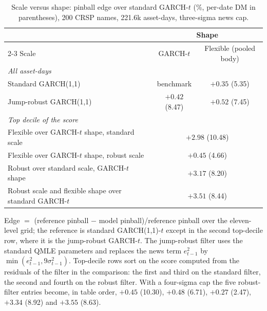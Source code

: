 \documentclass[11pt]{article}
\theoremstyle{remark}
\begin{document}
\begin{table}[t]
\centering
\begin{threeparttable}
\caption{Scale versus shape: pinball edge over standard GARCH-$t$ (\%, per-date DM in parentheses), 200 CRSP names, 221.6k asset-days, three-sigma news cap.}
\label{tab:scaleshape}
\begin{tabular}{lcc}
\toprule
& \multicolumn{2}{c}{Shape} \\
\cmidrule(lr){2-3}
Scale & GARCH-$t$ & Flexible (pooled body) \\
\midrule
\multicolumn{3}{l}{\emph{All asset-days}} \\
Standard GARCH(1,1) & benchmark & $+0.35$ (5.35) \\
Jump-robust GARCH(1,1) & $+0.42$ (8.47) & $+0.52$ (7.45) \\
\midrule
\multicolumn{3}{l}{\emph{Top decile of the score}} \\
Flexible over GARCH-$t$ shape, standard scale & \multicolumn{2}{c}{$+2.98$ (10.48)} \\
Flexible over GARCH-$t$ shape, robust scale & \multicolumn{2}{c}{$+0.45$ (4.66)} \\
Robust over standard scale, GARCH-$t$ shape & \multicolumn{2}{c}{$+3.17$ (8.20)} \\
Robust scale and flexible shape over standard GARCH-$t$ & \multicolumn{2}{c}{$+3.51$ (8.44)} \\
\bottomrule
\end{tabular}
\begin{tablenotes}\footnotesize
\item Edge $=$ (reference pinball $-$ model pinball)/reference pinball over the eleven-level grid; the reference is standard GARCH(1,1)-$t$ except in the second top-decile row, where it is the jump-robust GARCH-$t$. The jump-robust filter uses the standard QMLE parameters and replaces the news term $e_{t-1}^2$ by $\min(e_{t-1}^2, 9\sigma_{t-1}^2)$. Top-decile rows sort on the score computed from the residuals of the filter in the comparison: the first and third on the standard filter, the second and fourth on the robust filter. With a four-sigma cap the five robust-filter entries become, in table order, $+0.45$ (10.30), $+0.48$ (6.71), $+0.27$ (2.47), $+3.34$ (8.92) and $+3.55$ (8.63).
\end{tablenotes}
\end{threeparttable}
\end{table}
\end{document}
